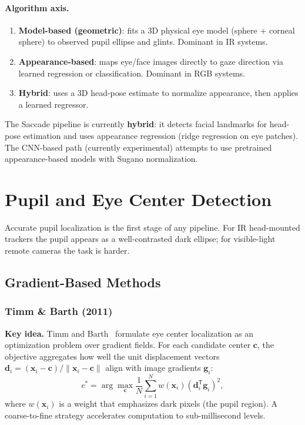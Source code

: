 \documentclass[11pt,a4paper]{article}
\begin{document}
\paragraph{Algorithm axis.}
\begin{enumerate}
  \item \textbf{Model-based (geometric)}: fits a 3D physical eye model (sphere + corneal sphere) to observed pupil ellipse and glints. Dominant in IR systems.
  \item \textbf{Appearance-based}: maps eye/face images directly to gaze direction via learned regression or classification. Dominant in RGB systems.
  \item \textbf{Hybrid}: uses a 3D head-pose estimate to normalize appearance, then applies a learned regressor.
\end{enumerate}

The Saccade pipeline is currently \textbf{hybrid}: it detects facial landmarks for head-pose estimation and uses appearance regression (ridge regression on eye patches). The CNN-based path (currently experimental) attempts to use pretrained appearance-based models with Sugano normalization.

\section{Pupil and Eye Center Detection}
\label{sec:pupil}

Accurate pupil localization is the first stage of any pipeline. For IR head-mounted trackers the pupil appears as a well-contrasted dark ellipse; for visible-light remote cameras the task is harder.

\subsection{Gradient-Based Methods}

\subsubsection{Timm \& Barth (2011)}

\textbf{Key idea.} Timm and Barth~\cite{timm2011accurate} formulate eye center localization as an optimization problem over gradient fields.
For each candidate center $\mathbf{c}$, the objective aggregates how well the unit displacement vectors $\mathbf{d}_i = (\mathbf{x}_i - \mathbf{c})/\|\mathbf{x}_i - \mathbf{c}\|$ align with image gradients $\mathbf{g}_i$:
\begin{equation}
  c^* = \arg\max_{\mathbf{c}} \frac{1}{N} \sum_{i=1}^{N} w(\mathbf{x}_i) \left(\mathbf{d}_i^{\mathsf{T}} \mathbf{g}_i\right)^2,
\end{equation}
where $w(\mathbf{x}_i)$ is a weight that emphasizes dark pixels (the pupil region).
A coarse-to-fine strategy accelerates computation to sub-millisecond levels.
\end{document}
